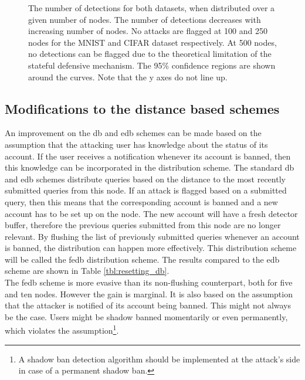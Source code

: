 \begin{figure}
\caption[Detections for more nodes]{The number of detections for both datasets, when distributed over a given number of nodes. The number of detections decreases with increasing number of nodes. No attacks are flagged at 100 and 250 nodes for the MNIST and CIFAR dataset respectively. At 500 nodes, no detections can be flagged due to the theoretical limitation of the stateful defensive mechanism. The 95\% confidence regions are shown around the curves. Note that the y axes do not line up.}
\label{fig:detections_nodes}
\end{figure}

\subsection{Modifications to the distance based schemes}\label{sec:distance_based_modifications}
An improvement on the \gls{db} and \gls{edb} schemes can be made based on the assumption that the attacking user has knowledge about the status of its account. If the user receives a notification whenever its account is banned, then this knowledge can be incorporated in the distribution scheme. The standard \gls{db} and \gls{edb} schemes distribute queries based on the distance to the most recently submitted queries from this node. If an attack is flagged based on a submitted query, then this means that the corresponding account is banned and a new account has to be set up on the node. The new account will have a fresh detector buffer, therefore the previous queries submitted from this node are no longer relevant. By flushing the list of previously submitted queries whenever an account is banned, the distribution can happen more effectively. This distribution scheme will be called the \gls{fedb} distribution scheme. The results compared to the \gls{edb} scheme are shown in Table \ref{tbl:resetting_db}.\\

The \gls{fedb} scheme is more evasive than its non-flushing counterpart, both for five and ten nodes. However the gain is marginal. It is also based on the assumption that the attacker is notified of its account being banned. This might not always be the case. Users might be shadow banned \cite{shadow_banning} momentarily or even permanently, which violates the assumption\footnote{A shadow ban detection algorithm should be implemented at the attack's side in case of a permanent shadow ban.}.\\

